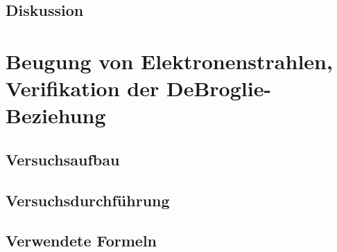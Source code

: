 \documentclass[12pt,a4paper]{article}
\begin{document}
\subsection{Diskussion}
\section{Beugung von Elektronenstrahlen, Verifikation der DeBroglie-Beziehung}
\subsection{Versuchsaufbau}
\subsection{Versuchsdurchführung}
\subsection{Verwendete Formeln}
\end{document}
